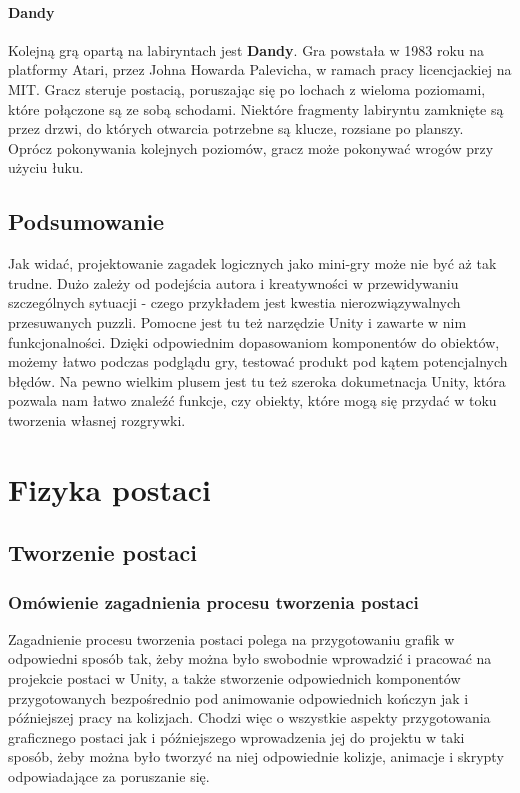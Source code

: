 \documentclass[oneside,polski,logo]{amuthesis}
\begin{document}
\subsubsection{Dandy}
\par Kolejną grą opartą na labiryntach jest \textbf{Dandy}. Gra powstała w 1983 roku na platformy Atari, przez Johna Howarda Palevicha, w ramach pracy licencjackiej na MIT. Gracz steruje postacią, poruszając się po lochach z wieloma poziomami, które połączone są ze sobą schodami. Niektóre fragmenty labiryntu zamknięte są przez drzwi, do których otwarcia potrzebne są klucze, rozsiane po planszy. Oprócz pokonywania kolejnych poziomów, gracz może pokonywać wrogów przy użyciu łuku. \cite{Dandy}
\clearpage
\section{Podsumowanie}
\par Jak widać, projektowanie zagadek logicznych jako mini-gry może nie być aż tak trudne. Dużo zależy od podejścia autora i kreatywności w przewidywaniu szczególnych sytuacji - czego przykładem jest kwestia nierozwiązywalnych przesuwanych puzzli. Pomocne jest tu też narzędzie Unity i zawarte w nim funkcjonalności. Dzięki odpowiednim dopasowaniom komponentów do obiektów, możemy łatwo podczas podglądu gry, testować produkt pod kątem potencjalnych błędów. Na pewno wielkim plusem jest tu też szeroka dokumetnacja Unity, która pozwala nam łatwo znaleźć funkcje, czy obiekty, które mogą się przydać w toku tworzenia własnej rozgrywki.
\chapter{Fizyka postaci}
\section{Tworzenie postaci}
\subsection{Omówienie zagadnienia procesu tworzenia postaci}
Zagadnienie procesu tworzenia postaci polega na przygotowaniu grafik w odpowiedni sposób tak, żeby można było swobodnie wprowadzić i pracować na projekcie postaci w Unity, a także stworzenie odpowiednich komponentów przygotowanych bezpośrednio pod animowanie odpowiednich kończyn jak i późniejszej pracy na kolizjach. Chodzi więc o wszystkie aspekty przygotowania graficznego postaci jak i późniejszego wprowadzenia jej do projektu w taki sposób, żeby można było tworzyć na niej odpowiednie kolizje, animacje i skrypty odpowiadające za poruszanie się.
\end{document}
